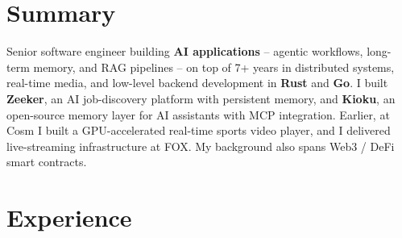 \documentclass[letterpaper]{twentysecondcv}
\begin{document}
\makeprofile

\section{Summary}

Senior software engineer building \textbf{AI applications} -- agentic workflows, long-term memory, and RAG pipelines -- on top of 7+ years in distributed systems, real-time media, and low-level backend development in \textbf{Rust} and \textbf{Go}. I built \textbf{Zeeker}, an AI job-discovery platform with persistent memory, and \textbf{Kioku}, an open-source memory layer for AI assistants with MCP integration. Earlier, at Cosm I built a GPU-accelerated real-time sports video player, and I delivered live-streaming infrastructure at FOX. My background also spans Web3 / DeFi smart contracts.


\section{Experience}
\end{document}
